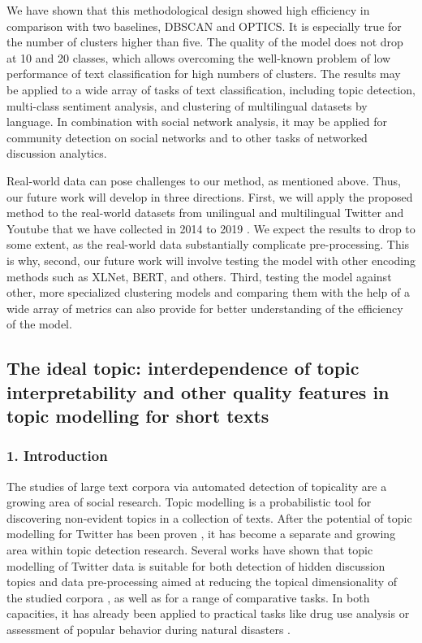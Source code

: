 We have shown that this methodological design showed high efficiency in comparison with two baselines, DBSCAN and OPTICS. It is especially true for the number of clusters higher than five. The quality of the model does not drop at 10 and 20 classes, which allows overcoming the well-known problem of low performance of text classification for high numbers of clusters. The results may be applied to a wide array of tasks of text classification, including topic detection, multi-class sentiment analysis, and clustering of multilingual datasets by language. In combination with social network analysis, it may be applied for community detection on social networks and to other tasks of networked discussion analytics.

Real-world data can pose challenges to our method, as mentioned above. Thus, our future work will develop in three directions. First, we will apply the proposed method to the real-world datasets from unilingual and multilingual Twitter and Youtube that we have collected in 2014 to 2019 \cite{BodrunovaBlekanovSmoliarova}. We expect the results to drop to some extent, as the real-world data substantially complicate pre-processing. This is why, second, our future work will involve testing the model with other encoding methods such as XLNet, BERT, and others. Third, testing the model against other, more specialized clustering models and comparing them with the help of a wide array of metrics can also provide for better understanding of the efficiency of the model.

\subsection{The ideal topic: interdependence of topic interpretability and other quality features in topic modelling for short texts}\label{subsec:ch5/sec2/sub3}

\subsubsection{1. Introduction}

The studies of large text corpora via automated detection of topicality are a growing area of social research. Topic modelling is a probabilistic tool for discovering non-evident topics in a collection of texts. After the potential of topic modelling for Twitter has been proven \cite{RamageDumaisLiebling}, it has become a separate and growing area within topic detection research. Several works have shown that topic modelling of Twitter data is suitable for both detection of hidden discussion topics and data pre-processing aimed at reducing the topical dimensionality of the studied corpora \cite{BlekanovTarasovMaksimov,KoltsovaKoltcov}, as well as for a range of comparative tasks. In both capacities, it has already been applied to practical tasks like drug use analysis \cite{JonnagaddalaJueDai} or assessment of popular behavior during natural disasters \cite{LigutomOrioRamacho,MacedaLlovidoPalaoag}.

